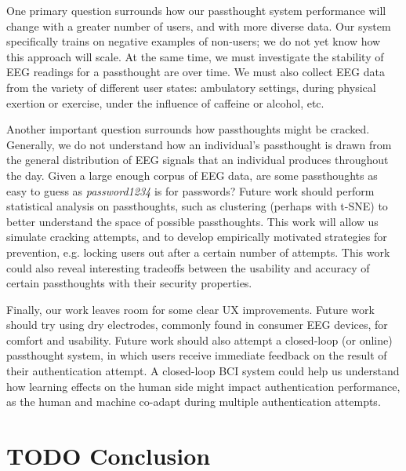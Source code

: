 \documentclass[letterpaper,twocolumn,10pt]{article}
\begin{document}
One primary question surrounds how our passthought system performance will change with a greater number of users, and with more diverse data. Our system specifically trains on negative examples of non-users; we do not yet know how this approach will scale. At the same time, we must investigate the stability of EEG readings for a passthought are over time. We must also collect EEG data from the variety of different user states: ambulatory settings, during physical exertion or exercise, under the influence of caffeine or alcohol, etc.

Another important question surrounds how passthoughts might be cracked.
Generally, we do not understand how an individual's passthought is drawn from the general distribution of EEG signals that an individual produces throughout the day.
Given a large enough corpus of EEG data, are some passthoughts as easy to guess as \textit{password1234} is for passwords?
Future work should perform statistical analysis on passthoughts, such as clustering (perhaps with t-SNE) to better understand the space of possible passthoughts.
This work will allow us simulate cracking attempts, and to develop empirically motivated strategies for prevention, e.g. locking users out after a certain number of attempts.
This work could also reveal interesting tradeoffs between the usability and accuracy of certain passthoughts with their security properties.

Finally, our work leaves room for some clear UX improvements.
Future work should try using dry electrodes, commonly found in consumer EEG devices, for comfort and usability.
Future work should also attempt a closed-loop (or online) passthought system, in which users receive immediate feedback on the result of their authentication attempt. A closed-loop BCI system could help us understand how learning effects
on the human side might impact authentication performance, as the human and machine co-adapt during multiple authentication attempts.

\section{TODO Conclusion}

{\footnotesize 
}
\end{document}
